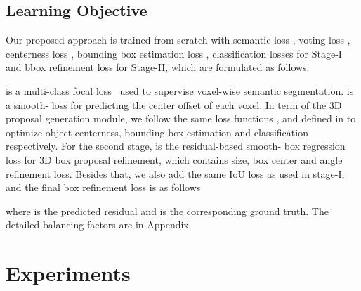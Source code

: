 \documentclass{article}
\begin{document}
\iffalse
\textbf{Sparse Grouping layer.} The inputs to this layer are a RoI-specific point set  and the same input voxels  as the sampling layer. We exploit a sparse convolution centered on each sampled point to group a set of neighboring input voxels  within the kernel size  as:
 
where  is the number of neighboring voxels queried by the  RoI-specific point with kernel size .   is a shared sparse 3D convolution for all the proposals and only applied on the points that their neighboring voxel set are non-empty.  means empty voxel. Then, to hold the surface geometry and reduce computation cost, we abandon the empty parts, and the output of this block is .
\fi


\subsection{Learning Objective}\label{sec:loss}
Our proposed approach is trained from scratch with semantic loss , voting loss , centerness loss , bounding box estimation loss , classification losses  for Stage-I and bbox refinement loss  for Stage-II, which are formulated as follows:


 is a multi-class focal loss~\cite{lin2017focal} used to supervise voxel-wise semantic segmentation.  is a smooth- loss for predicting the center offset of each voxel. In term of the 3D proposal generation module, we follow the same loss functions ,  and  defined in \cite{rukhovich2021fcaf3d} to optimize object centerness, bounding box estimation and classification respectively. For the second stage,   is the residual-based smooth- box regression loss for 3D box proposal refinement, which contains size, box center and angle refinement loss. Besides that, we also add the same IoU loss  as used in stage-I, and the final box refinement loss is as follows


where  is the predicted residual and  is the corresponding ground truth. The detailed balancing factors are in Appendix.

\section{Experiments}
\end{document}
